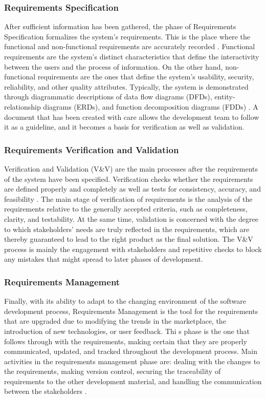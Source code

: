 \documentclass[conference]{IEEEtran}
\begin{document}
\subsubsection{Requirements Specification}

After sufficient information has been gathered, the phase of Requirements Specification formalizes the system’s requirements. This is the place where the functional and non-functional requirements are accurately recorded \cite{cite4}. Functional requirements are the system's distinct characteristics that define the interactivity between the users and the process of information. On the other hand, non-functional requirements are the ones that define the system’s usability, security, reliability, and other quality attributes. Typically, the system is demonstrated through diagrammatic descriptions of data flow diagrams (DFDs), entity-relationship diagrams (ERDs), and function decomposition diagrams (FDDs) \cite{cite4}. A document that has been created with care allows the development team to follow it as a guideline, and it becomes a basis for verification as well as validation.

\subsubsection{Requirements Verification and Validation}

Verification and Validation (V\&V) are the main processes after the requirements of the system have been specified. Verification checks whether the requirements are defined properly and completely as well as tests for consistency, accuracy, and feasibility \cite{cite5}. The main stage of verification of requirements is the analysis of the requirements relative to the generally accepted criteria, such as completeness, clarity, and testability. At the same time, validation is concerned with the degree to which stakeholders' needs are truly reflected in the requirements, which are thereby guaranteed to lead to the right product as the final solution. The V\&V process is mainly the engagement with stakeholders and repetitive checks to block any mistakes that might spread to later phases of development.

\subsubsection{Requirements Management}
Finally, with its ability to adapt to the changing environment of the software development process, Requirements Management is the tool for the requirements that are upgraded due to modifying the trends in the marketplace, the introduction of new technologies, or user feedback. Thi s phase is the one that follows through with the requirements, making certain that they are properly communicated, updated, and tracked throughout the development process. Main activities in the requirements management phase are: dealing with the changes to the requirements, making version control, securing the traceability of requirements to the other development material, and handling the communication between the stakeholders \cite{cite6}.
\end{document}

